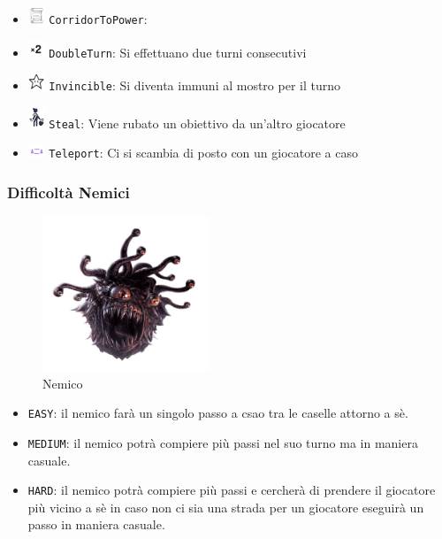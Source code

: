 \documentclass[a4paper,12pt]{report}
\begin{document}
\begin{itemize}
	\item \includegraphics[width=0.5cm]{img/PowerUps/CorridorToPower.png} \texttt{CorridorToPower}: 
	\item \includegraphics[width=0.5cm]{img/PowerUps/Double.png} \texttt{DoubleTurn}: Si effettuano due turni consecutivi
	\item \includegraphics[width=0.5cm]{img/PowerUps/Invincible.png} \texttt{Invincible}: Si diventa immuni al mostro per il turno
	\item \includegraphics[width=0.5cm]{img/PowerUps/Steal.png} \texttt{Steal}: Viene rubato un obiettivo da un'altro giocatore
	\item \includegraphics[width=0.5cm]{img/PowerUps/Teleport.png} \texttt{Teleport}: Ci si scambia di posto con un giocatore a caso
\end{itemize}

\subsubsection*{Difficoltà Nemici}

\begin{figure}[H]
	\centering
	\includegraphics[width=5cm]{img/Nemico.png}
	\caption{Nemico}
	\label{img:Nemico}
\end{figure}

\begin{itemize}
	\item \texttt{EASY}: il nemico farà un singolo passo a csao tra le caselle attorno a sè.
	\item \texttt{MEDIUM}: il nemico potrà compiere più passi nel suo turno ma in maniera casuale.
	\item \texttt{HARD}: il nemico potrà compiere più passi e cercherà di prendere il giocatore più vicino a sè
	in caso non ci sia una strada per un giocatore eseguirà un passo in maniera casuale.
\end{itemize}
\end{document}
